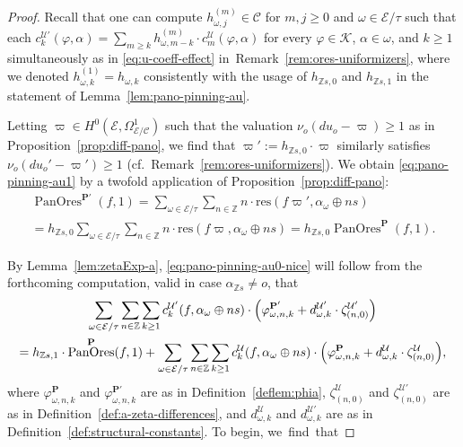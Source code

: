 \documentclass[preprint,12pt]{elsarticle}
\numberwithin{equation}{section} %
\theoremstyle{theorem}
\theoremstyle{definition}
\newcommand{\Ca}{\mathcal{C}} %
\newcommand{\bk}{\mathcal{K}} %
\newcommand{\ec}{\mathcal{E}} %
\newcommand{\idec}{{o}} %
\newcommand{\orbita}{{\ec/\tau}} %
\newcommand{\Z}{\mathbb{Z}} %
\newcommand{\za}[2]{\zeta^{\mathcal{U}}_{( {#1} , {#2} )}}
\DeclareMathOperator{\pano}{PanOres}
\begin{document}
\begin{proof} Recall that one can compute $h^{(m)}_{\omega,j}\in\Ca$ for $m,j\geq 0$ and $\omega\in\orbita$ such that each $c_k^{\mathcal{U}'}(\varphi,\alpha)=\sum_{m\geq k}h^{(m)}_{\omega,m-k}\cdot c_m^{\mathcal{U}}(\varphi,\alpha)$ for every $\varphi\in\bk$, $\alpha\in \omega$, and $k\geq 1$ simultaneously as in \eqref{eq:u-coeff-effect} in~Remark~\ref{rem:ores-uniformizers}, where we denoted $h^{(1)}_{\omega,k}=h_{\omega,k}$ consistently with the usage of $h_{\Z s,0}$ and $h_{\Z s,1}$ in the statement of Lemma~\ref{lem:pano-pinning-au}.

Letting $\varpi\in H^0(\ec,\Omega^1_{\ec/\Ca})$ such that the valuation $\nu_\idec(du_\idec-\varpi)\geq 1$ as in Proposition~\ref{prop:diff-pano}, we find that $\varpi':=h_{\Z s,0}\cdot\varpi$ similarly satisfies $\nu_\idec(du_\idec'-\varpi')\geq 1$ (cf.~Remark~\ref{rem:ores-uniformizers}). We obtain \eqref{eq:pano-pinning-au1} by a twofold application of Proposition~\ref{prop:diff-pano}:
\begin{multline*}\pano^{\mathbf{P}'}(f,1)=\sum_{\omega\in\orbita}\sum_{n\in\Z}n\cdot\mathrm{res}(f\varpi',\alpha_\omega\oplus ns)\\=h_{\Z s,0}\sum_{\omega\in\orbita}\sum_{n\in\Z}n\cdot\mathrm{res}(f\varpi,\alpha_\omega\oplus ns)=h_{\Z s,0}\pano^\mathbf{P}(f,1).\end{multline*}
    
 By Lemma~\ref{lem:zetaExp-a}, \eqref{eq:pano-pinning-au0-nice} will follow from the forthcoming computation, valid in case $\alpha_{\Z s}\neq \idec$, that \begin{gather}\label{eq:pano-pinning-au0-proof} \sum_{\omega\in\orbita}\sum_{n\in\Z}\sum_{k\geq 1}c^{\mathcal{U}'}_k(f,\alpha_\omega\oplus ns)\cdot\Bigl(\varphi^{\mathbf{P}'}_{\omega,n,k}+d^{\mathcal{U}'}_{\omega,k}\cdot\zeta^{\mathcal{U}'}_{(n,0)}\Bigr)\\ =h_{\Z s,1}\cdot\pano^\mathbf{P}(f,1)+\sum_{\omega\in\orbita}\sum_{n\in\Z}\sum_{k\geq 1}c^{\mathcal{U}}_k(f,\alpha_\omega\oplus ns)\cdot\Bigl(\varphi^{\mathbf{P}}_{\omega,n,k}+d^{\mathcal{U}}_{\omega,k}\cdot\zeta^{\mathcal{U}}_{(n,0)}\Bigr),\notag\end{gather} where $\varphi_{\omega,n,k}^{\mathbf{P}}$ and $\varphi_{\omega,n,k}^{\mathbf{P}'}$ are as in Definition~\ref{deflem:phia}, $\za{n}{0}$ and $\zeta^{\mathcal{U}'}_{(n,0)}$ are as in Definition~\ref{def:a-zeta-differences}, and $d^\mathcal{U}_{\omega,k}$ and $d^{\mathcal{U}'}_{\omega,k}$ are as in Definition~\ref{def:structural-constants}. To begin, \mbox{we find that}
 

\end{proof}
\end{document}
